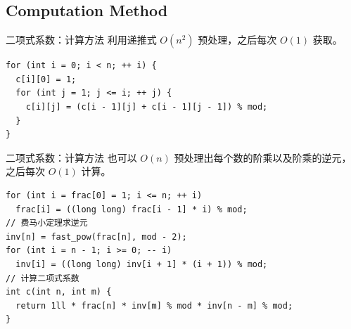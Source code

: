 \documentclass[12pt,aspectratio=169,handout]{beamer}
\begin{document}



\subsection[计算方法]{Computation Method}

\begin{frame}[fragile]{二项式系数：计算方法}
利用递推式 $O(n^2)$ 预处理，之后每次 $O(1)$ 获取。

\begin{verbatim}
for (int i = 0; i < n; ++ i) {
  c[i][0] = 1;
  for (int j = 1; j <= i; ++ j) {
    c[i][j] = (c[i - 1][j] + c[i - 1][j - 1]) % mod;
  }
}
\end{verbatim}
\end{frame}

\begin{frame}[fragile]{二项式系数：计算方法}
也可以 $O(n)$ 预处理出每个数的阶乘以及阶乘的逆元，之后每次 $O(1)$ 计算。

\begin{verbatim}
for (int i = frac[0] = 1; i <= n; ++ i)
  frac[i] = ((long long) frac[i - 1] * i) % mod;
// 费马小定理求逆元
inv[n] = fast_pow(frac[n], mod - 2);
for (int i = n - 1; i >= 0; -- i)
  inv[i] = ((long long) inv[i + 1] * (i + 1)) % mod;
// 计算二项式系数
int c(int n, int m) {
  return 1ll * frac[n] * inv[m] % mod * inv[n - m] % mod;
}
\end{verbatim}
\end{frame}
\end{document}
